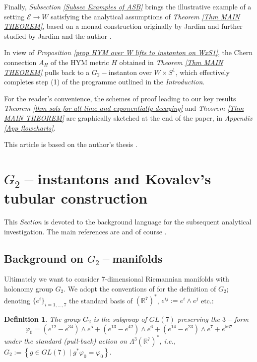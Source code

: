 \documentclass{article}
\newtheorem{definition}[theorem]{Definition}
\begin{document}
Finally, \emph{Subsection \ref{Subsec Examples of ASB}} brings the illustrative example of a
setting $\mathcal{E}\rightarrow W$ satisfying the analytical assumptions of \emph{Theorem \ref{Thm MAIN THEOREM}}, based on a monad construction originally by Jardim \cite{Jardim Bull Braz} and further studied by Jardim and the author \cite{FAE}. 

In view of \emph{Proposition  \ref{prop HYM over W lifts to instanton on WxS1}}, the Chern connection $A_H$ of the HYM metric $H$ obtained in \emph{Theorem \ref{Thm MAIN THEOREM}} pulls back to a $G_2-$instanton over $W\times S^1$, which effectively completes step (1) of the programme outlined in the \emph{Introduction}.

For the reader's convenience, the schemes of proof leading to our key results 
\emph{Theorem \ref{thm sols for all time and exponentially decaying}} and \emph{Theorem \ref{Thm MAIN THEOREM}} are graphically sketched at the end of the paper, in \emph{Appendix \ref{App flowcharts}}.

This article is based on the author's thesis \cite{MyThesis}.
\newpage

\section{$G_{2}-$instantons and Kovalev's tubular construction}
\label{sec gauge theory on G2 mfds}
This \emph{Section} is devoted to the background language for the subsequent analytical investigation. The main references are \cite{Bryant,Salamon,Joyce} and of course \cite{kovalevzinho,kovalevzao}.

\subsection{Background on $G_2-$manifolds}
\label{subsec backgroud G2}
Ultimately we want to consider 7-dimensional Riemannian manifolds with holonomy group $%
G_{2}$. We adopt the conventions of \cite[p.155]{Salamon} for the
definition of $G_{2}$; denoting $\{e^i\}_{i=1,...,7}$ the standard basis of $\left(\mathbb{R}^{7}\right)^*$, $e^{ij}:= e^i\wedge e^j$ etc.:
\begin{definition}      \label{form phi}      
The \emph{group }$G_{2}$ is the subgroup of $GL(7)$ preserving the $3-$form%
\begin{equation}        \label{eq form phi0}
        \varphi _{0}=\left( e^{12}-e^{34}\right) \wedge e^{5}
        +\left(e^{13}-e^{42}\right) \wedge e^{6}
        +\left( e^{14}-e^{23}\right) \wedge e^{7}+e^{567}
\end{equation}%
under the standard (pull-back) action on $\Lambda ^{3}\left( \mathbb{R}%
^{7}\right) ^{\ast }$, i.e., %
$
        G_{2}:= \left\{ g\in GL(7) \mid 
        g^{\ast}\varphi _{0}=\varphi _{0}\right\} .
$\end{definition}
\end{document}
